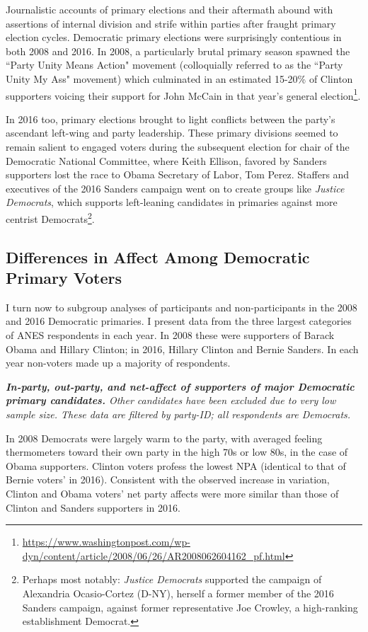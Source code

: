 \documentclass[12pt]{article}
\begin{document}
Journalistic accounts of primary elections and their aftermath abound with assertions of internal division and strife within parties after fraught primary election cycles. Democratic primary elections were surprisingly contentious in both 2008 and 2016. In 2008, a particularly brutal primary season spawned the ``Party Unity Means Action" movement (colloquially referred to as the ``Party Unity My Ass" movement) which culminated in an estimated 15-20\% of Clinton supporters voicing their support for John McCain in that year's general election\footnote{\url{https://www.washingtonpost.com/wp-dyn/content/article/2008/06/26/AR2008062604162_pf.html}}.

In 2016 too, primary elections brought to light conflicts between the party's ascendant left-wing and party leadership. These primary divisions seemed to remain salient to engaged voters during the subsequent election for chair of the Democratic National Committee, where Keith Ellison, favored by Sanders supporters lost the race to Obama Secretary of Labor, Tom Perez. Staffers and executives of the 2016 Sanders campaign went on to create groups like \textit{Justice Democrats}, which supports left-leaning candidates in primaries against more centrist Democrats\footnote{Perhaps most notably: \textit{Justice Democrats} supported the campaign of Alexandria Ocasio-Cortez (D-NY), herself a former member of the 2016 Sanders campaign, against former representative Joe Crowley, a high-ranking establishment Democrat.}. 




 

\subsection{Differences in Affect Among Democratic Primary Voters}
I turn now to subgroup analyses of participants and non-participants in the 2008 and 2016 Democratic primaries. I present data from the three largest categories of ANES respondents in each year. In 2008 these were supporters of Barack Obama and Hillary Clinton; in 2016, Hillary Clinton and Bernie Sanders. In each year non-voters made up a majority of respondents.
\begin{table}[H]

\caption{\label{table} \textit{\textbf{In-party, out-party, and net-affect of supporters of major Democratic primary candidates.} Other candidates have been excluded due to very low sample size. These data are filtered by party-ID; all respondents are Democrats.}}
\end{table}
In 2008 Democrats were largely warm to the party, with averaged feeling thermometers toward their own party in the high 70s or low 80s, in the case of Obama supporters. Clinton voters profess the lowest NPA (identical to that of Bernie voters' in 2016). Consistent with the observed increase in variation, Clinton and Obama voters' net party affects were more similar than those of Clinton and Sanders supporters in 2016.
\end{document}

